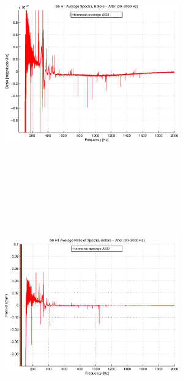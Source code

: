 \begin{figure}
\begin{center}
\includegraphics[height=100mm, width=75mm]{figure13a.eps}
\includegraphics[height=100mm, width=75mm]{figure13b.eps}

\end{center}
\end{figure}
